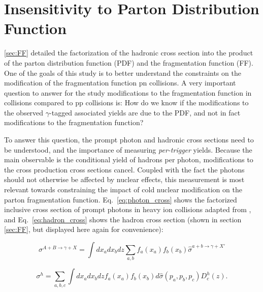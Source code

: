 \section{Insensitivity to Parton Distribution Function}
\label{sec:insensitivity}
\ref{sec:FF} detailed the factorization of the hadronic cross section into the product of the parton distribution function (PDF) and the fragmentation function (FF). One of the goals of this study is to better understand the constraints on the modification of the fragmentation function pn \pPb collisions. A very important question to answer for the study modifications to the fragmentation function in \pPb~ collisions compared to pp collisions is: How do we know if the modifications to the observed $\gamma$-tagged associated yields are due to the PDF, and not in fact modifications to the fragmentation function?

To answer this question, the prompt photon and hadronic cross sections need to be understood, and the importance of measuring  \textit{per-trigger} yields. Because the main observable is the conditional yield of hadrons per photon, modifications to the cross production cross sections cancel. Coupled with the fact the photons should not otherwise be affected by nuclear effects, this measurement is most relevant towards constraining the impact of cold nuclear modification on the parton fragmentation function. Eq.~\ref{eq:photon_cross} shows the factorized inclusive cross section of prompt photons in heavy ion collisions adapted from \cite{Catani2002}, and Eq.~\ref{eq:hadron_cross} shows the hadron cross section (shown in section \ref{sec:FF}, but displayed here again for convenience):


\begin{equation}
  \sigma^{A+B\rightarrow\gamma+X} = \int dx_a dx_b dz \sum_{a,b}f_{a}(x_a)f_{b}(x_b) \hat{\sigma}^{a+b\rightarrow\gamma+X'}
\end{equation}
\label{eq:photon_cross}

\begin{equation}
  \sigma^h= \sum_{a,b,c} \int dx_a dx_b dz f_a(x_a) f_b(x_b) d\hat{\sigma}(p_a,p_b,p_c) D_c^h(z).
  \label{eq:hadron_cross}
\end{equation}

